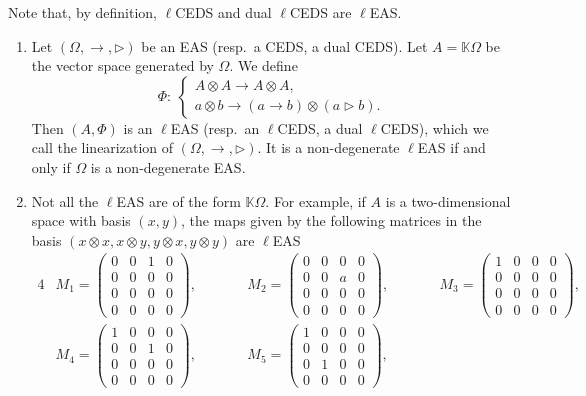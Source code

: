 \documentclass[pdftex]{sigma}
\numberwithin{equation}{section}
\begin{document}
Note that, by definition, $\ell$CEDS and dual $\ell$CEDS are $\ell$EAS.

\begin{Example}\label{ex4.1} \quad
\begin{enumerate}\itemsep=0pt
\item[(1)] Let $(\Omega,\rightarrow,\triangleright)$ be an EAS (resp.\ a CEDS, a dual CEDS). Let $A=\mathbb{K} \Omega$ be the vector space generated by $\Omega$. We define
\[\Phi\colon \ \begin{cases}
A\otimes A \longrightarrow A\otimes A,\\
a\otimes b \longrightarrow (a\rightarrow b)\otimes (a\triangleright b).
\end{cases}\]
Then $(A,\Phi)$ is an $\ell$EAS (resp.\ an $\ell$CEDS, a dual $\ell$CEDS), which we call the linearization of $(\Omega,\rightarrow,\triangleright)$. It is a non-degenerate $\ell$EAS if and only if $\Omega$ is a non-degenerate EAS.
\item[(2)] Not all the $\ell$EAS are of the form $\mathbb{K}\Omega$. For example, if $A$ is a two-dimensional space with basis $(x,y)$, the maps given by the following matrices in the basis $(x\otimes x,x\otimes y,y\otimes x,y\otimes y)$ are $\ell$EAS
\begin{alignat*}{4}
&M_1 =\begin{pmatrix}0&0&1&0\\0&0&0&0\\0&0&0&0\\0&0&0&0\end{pmatrix},\qquad&&
M_2 =\begin{pmatrix}0&0&0&0\\0&0&a&0\\0&0&0&0\\0&0&0&0\end{pmatrix},\qquad&&
M_3=\begin{pmatrix}1&0&0&0\\0&0&0&0\\0&0&0&0\\0&0&0&0\end{pmatrix},&\\
&M_4=\begin{pmatrix}1&0&0&0\\0&0&1&0\\0&0&0&0\\0&0&0&0\end{pmatrix},\qquad&&
M_5=\begin{pmatrix}1&0&0&0\\0&0&0&0\\0&1&0&0\\0&0&0&0\end{pmatrix},\qquad&&

\end{alignat*}
\end{enumerate}
\end{Example}
\end{document}
